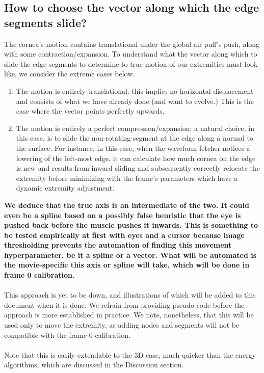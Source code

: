 \documentclass[epjST]{svjour}
\begin{document}
\subsection*{How to choose the vector along which the edge segments slide?}
The cornea's motion contains translational under the global air puff's push, along with some contraction/expansion. To understand what the vector along which to slide the edge segments to determine to true motion of our extremities must look like, we consider the extreme cases below.
\begin{enumerate}
    \item The motion is entirely translational: this implies no horizontal displacement and consists of what we have already done (and want to evolve.) This is the case where the vector points perfectly upwards.
    \\\item The motion is entirely a perfect compression/expansion: a natural choice, in this case, is to slide the non-rotating segment at the edge along a normal to the surface. For instance, in this case, when the waveform fetcher notices a lowering of the left-most edge, it can calculate how much cornea on the edge is new and results from inward sliding and subsequently correctly relocate the extremity before minimizing with the frame's parameters which have a dynamic extremity adjustment.
\end{enumerate}
\textbf{We deduce that the true axis is an intermediate of the two. It could even be a spline based on a possibly false heuristic that the eye is pushed back before the muscle pushes it inwards. This is something to be tested empirically at first with eyes and a cursor because image thresholding prevents the automation of finding this movement hyperparameter, be it a spline or a vector. What will be automated is the movie-specific this axis or spline will take, which will be done in frame 0 calibration.}\\\\
This approach is yet to be down, and illustrations of which will be added to this document when it is done. We refrain from providing pseudo-code before the approach is more established in practice. We note, nonetheless, that this will be used only to move the extremity, as adding nodes and segments will not be compatible with the frame 0 calibration. \\\\
Note that this is easily extendable to the 3D case, much quicker than the energy algorithms, which are discussed in the Discussion section.
\end{document}
